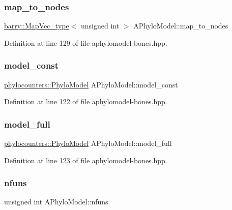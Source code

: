 \subsubsection{\texorpdfstring{map\+\_\+to\+\_\+nodes}{map\_to\_nodes}}
{\footnotesize\ttfamily \hyperlink{namespacebarry_a2f0d3aab1d67e4c8eaeab9022e16139f}{barry\+::\+Map\+Vec\+\_\+type}$<$ unsigned int $>$ A\+Phylo\+Model\+::map\+\_\+to\+\_\+nodes}



Definition at line 129 of file aphylomodel-\/bones.\+hpp.

\mbox{\label{class_a_phylo_model_ad91e946cad1e96aa444b586921d1ebe6}} 
\subsubsection{\texorpdfstring{model\+\_\+const}{model\_const}}
{\footnotesize\ttfamily \hyperlink{namespacebarry_1_1counters_1_1phylo_ad32b4186e3bab93119df225fddc3c609}{phylocounters\+::\+Phylo\+Model} A\+Phylo\+Model\+::model\+\_\+const}



Definition at line 122 of file aphylomodel-\/bones.\+hpp.

\mbox{\label{class_a_phylo_model_a79c9e748c657487a60497265348f8a14}} 
\subsubsection{\texorpdfstring{model\+\_\+full}{model\_full}}
{\footnotesize\ttfamily \hyperlink{namespacebarry_1_1counters_1_1phylo_ad32b4186e3bab93119df225fddc3c609}{phylocounters\+::\+Phylo\+Model} A\+Phylo\+Model\+::model\+\_\+full}



Definition at line 123 of file aphylomodel-\/bones.\+hpp.

\mbox{\label{class_a_phylo_model_a1abbdd05ac20bf7f0bdb0366190198a1}} 
\subsubsection{\texorpdfstring{nfuns}{nfuns}}
{\footnotesize\ttfamily unsigned int A\+Phylo\+Model\+::nfuns}



